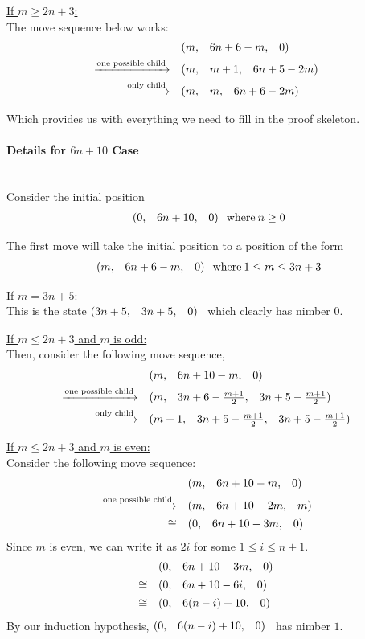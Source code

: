 \documentclass{article}
\makeatletter
\newcommand{\game}[3]{\begin{array}{@{}*6r}(#1, & #2, & #3)\end{array}}
\makeatother
\begin{document}
\bigskip
\underline{If $m \geq 2n + 3$:} \\
The move sequence below works:
\begin{align*}
  & \game{m}{6n+6-m}{0} \\
  \xrightarrow{\text{one possible child}} \quad & 
  \game{m}{m+1}{6n+5-2m} \\
  \xrightarrow{\text{only child}} \quad & 
  \game{m}{m}{6n+6-2m} \\
\end{align*}

\bigskip
Which provides us with everything we need to fill in the proof
skeleton.
\newpage

\paragraph{Details for $6n+10$ Case}\mbox{}\\
Consider the initial position
\begin{equation*}
  \game{0}{6n+10}{0} \: \text{where} \: n \geq 0
\end{equation*}

\medskip
The first move will take the initial position to a position of the form
\begin{equation*}
  \game{m}{6n+6-m}{0} \: \text{where} \: 1 \leq m \leq 3n+3
\end{equation*}

\bigskip
\underline{If $m = 3n+5$:} \\
This is the state $\game{3n+5}{3n+5}{0}$ which clearly has nimber $0$.

\bigskip
\underline{If $m \leq 2n + 3$ and $m$ is odd:} \\
Then, consider the following move sequence,
\begin{align*}
  & \game{m}{6n+10-m}{0} \\
  \xrightarrow{\text{one possible child}} \quad & 
  \game{m}{3n+6-\frac{m+1}{2}}{3n+5-\frac{m+1}{2}} \\
  \xrightarrow{\text{only child}} \quad & 
  \game{m+1}{3n+5-\frac{m+1}{2}}{3n+5-\frac{m+1}{2}} \\
\end{align*}

\bigskip
\underline{If $m \leq 2n + 3$ and $m$ is even:} \\
Consider the following move sequence:
\begin{align*}
  & \game{m}{6n+10-m}{0} \\
  \xrightarrow{\text{one possible child}} \quad & 
  \game{m}{6n+10-2m}{m} \\
  \cong \quad & 
  \game{0}{6n+10-3m}{0} \\
\end{align*}
Since $m$ is even, we can write it as $2i$ for some $1\leq i\leq n+1$.
\begin{align*}
  & \game{0}{6n+10-3m}{0} \\
  \cong \quad & \game{0}{6n+10-6i}{0} \\
  \cong \quad & \game{0}{6(n-i)+10}{0} \\
\end{align*}
By our induction hypothesis, $\game{0}{6(n-i)+10}{0}$ has nimber $1$.
\end{document}
